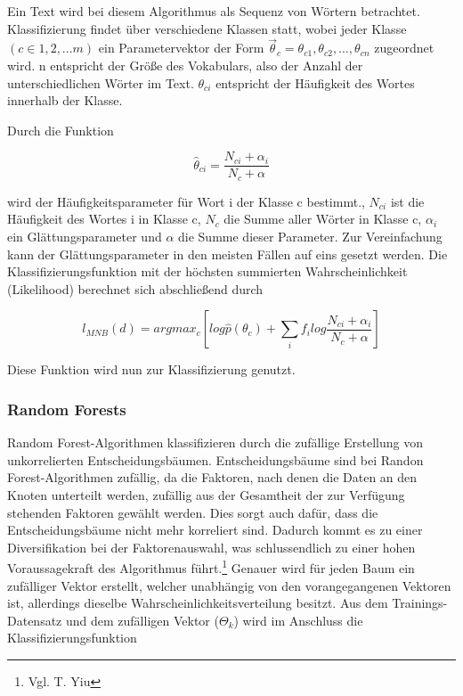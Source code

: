 \documentclass[a4paper,12pt]{article}
\begin{document}
Ein Text wird bei diesem Algorithmus als Sequenz von Wörtern betrachtet. Klassifizierung findet über verschiedene Klassen statt, wobei jeder Klasse $(c \in{1,2,…m})$ ein Parametervektor der Form $\vec{\theta}_c={\theta_{c1},\theta_{c2},…,\theta_{cn}}$ zugeordnet wird. n entspricht der Größe des Vokabulars, also der Anzahl der unterschiedlichen Wörter im Text. $\theta_{ci}$ entspricht der Häufigkeit des Wortes innerhalb der Klasse. 

Durch die Funktion 

\begin{equation}
\hat{\theta}_{ci}=\frac{N_{ci}+\alpha_i}{N_c+\alpha}
\end{equation}

wird der Häufigkeitsparameter für Wort i der Klasse c bestimmt., $N_{ci}$ ist die Häufigkeit des Wortes i in Klasse c, $N_c$ die Summe aller Wörter in Klasse c, $\alpha_i$ ein Glättungsparameter und $\alpha$ die Summe dieser Parameter. Zur Vereinfachung kann der Glättungsparameter in den meisten Fällen auf eins gesetzt werden. 
Die Klassifizierungsfunktion mit der höchsten summierten Wahrscheinlichkeit (Likelihood) berechnet sich abschließend durch 

\begin{equation}
l_{MNB}(d)=argmax_c \left[log\hat{p}(\theta_c)+\sum_i{f_i log\frac{N_{ci}+\alpha_i}{N_c+\alpha}}\right]
\end{equation}

Diese Funktion wird nun zur Klassifizierung genutzt.


\subsubsection{Random Forests}

Random Forest-Algorithmen klassifizieren durch die zufällige Erstellung von unkorrelierten Entscheidungsbäumen. Entscheidungsbäume sind bei Randon Forest-Algorithmen zufällig, da die Faktoren, nach denen die Daten an den Knoten unterteilt werden, zufällig aus der Gesamtheit der zur Verfügung stehenden Faktoren gewählt werden. Dies sorgt auch dafür, dass die Entscheidungsbäume nicht mehr korreliert sind. Dadurch kommt es zu einer Diversifikation bei der Faktorenauswahl, was schlussendlich zu einer hohen Voraussagekraft des Algorithmus führt.\footnote{Vgl. T. Yiu} Genauer wird für jeden Baum ein zufälliger Vektor erstellt, welcher unabhängig von den vorangegangenen Vektoren ist, allerdings dieselbe Wahrscheinlichkeitsverteilung besitzt. Aus dem Trainings-Datensatz und dem zufälligen Vektor ($\Theta_k$) wird im Anschluss die Klassifizierungsfunktion 
\end{document}
